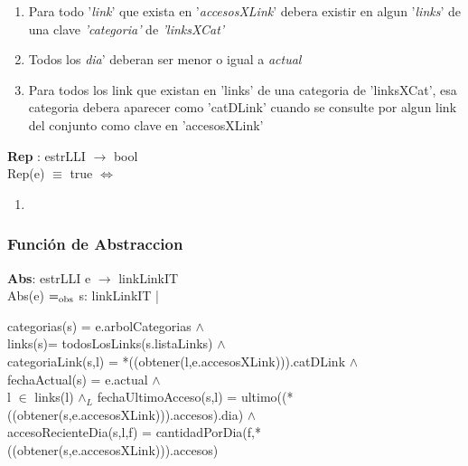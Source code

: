 \documentclass[10pt, a4paper]{article}
\begin{document}
	  \begin{enumerate}
	
		\item Para todo '\textit{link}' que exista en '\textit{accesosXLink}' debera existir en algun '\textit{links}' de una clave \textit{'categoria'} de \textit{'linksXCat'}
	  
		\item Todos los \textit{dia}' deberan ser menor o igual a \textit{actual}
		
		\item Para todos los link que existan en 'links' de una categoria de 'linksXCat', esa categoria debera aparecer como 'catDLink' cuando se consulte por algun link del conjunto como clave en 'accesosXLink'		
	  
	  \end{enumerate}
	 
	
	   \textbf{Rep} : estrLLI $\longrightarrow$ bool\\
	        Rep(e) $\equiv$ true $\Longleftrightarrow$\\
	
	   \begin{enumerate}

	   \item
 
\end{enumerate}

\subsubsection{\Large Funci\'{o}n de Abstraccion}

	    \textbf{Abs}: estrLLI e $\rightarrow$ linkLinkIT \\
   	    Abs(e) $=_{\mathrm{obs}}$ s: linkLinkIT | \\
   	   \begin{flushright}
 categorias(s) = e.arbolCategorias $\wedge$ \\
 links(s)= todosLosLinks(s.listaLinks) $\wedge$ \\
 categoriaLink(s,l) = *((obtener(l,e.accesosXLink))).catDLink $\wedge$ \\
fechaActual(s) = e.actual $\wedge$ \\
 l $\in$ links(l) $\wedge{_L}$ fechaUltimoAcceso(s,l) = ultimo((*((obtener(s,e.accesosXLink))).accesos).dia) $\wedge$ \\
 accesoRecienteDia(s,l,f) = cantidadPorDia(f,*((obtener(s,e.accesosXLink))).accesos)
\end{flushright}
	
\end{document}
